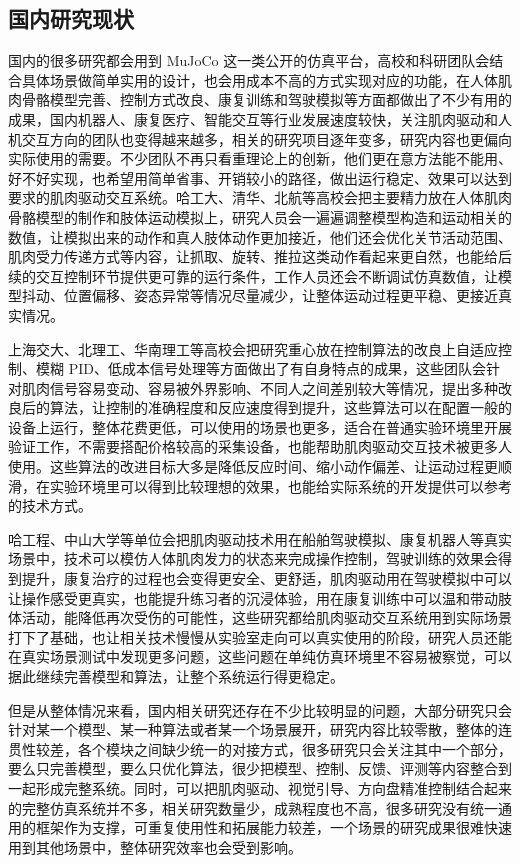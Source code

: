 \subsection{国内研究现状}
国内的很多研究都会用到 MuJoCo 这一类公开的仿真平台，高校和科研团队会结合具体场景做简单实用的设计，也会用成本不高的方式实现对应的功能，在人体肌肉骨骼模型完善、控制方式改良、康复训练和驾驶模拟等方面都做出了不少有用的成果，国内机器人、康复医疗、智能交互等行业发展速度较快，关注肌肉驱动和人机交互方向的团队也变得越来越多，相关的研究项目逐年变多，研究内容也更偏向实际使用的需要。不少团队不再只看重理论上的创新，他们更在意方法能不能用、好不好实现，也希望用简单省事、开销较小的路径，做出运行稳定、效果可以达到要求的肌肉驱动交互系统。哈工大、清华、北航等高校会把主要精力放在人体肌肉骨骼模型的制作和肢体运动模拟上，研究人员会一遍遍调整模型构造和运动相关的数值，让模拟出来的动作和真人肢体动作更加接近，他们还会优化关节活动范围、肌肉受力传递方式等内容，让抓取、旋转、推拉这类动作看起来更自然，也能给后续的交互控制环节提供更可靠的运行条件，工作人员还会不断调试仿真数值，让模型抖动、位置偏移、姿态异常等情况尽量减少，让整体运动过程更平稳、更接近真实情况\cite{zhang2026shenjing}。

上海交大、北理工、华南理工等高校会把研究重心放在控制算法的改良上自适应控制、模糊 PID、低成本信号处理等方面做出了有自身特点的成果，这些团队会针对肌肉信号容易变动、容易被外界影响、不同人之间差别较大等情况，提出多种改良后的算法，让控制的准确程度和反应速度得到提升，这些算法可以在配置一般的设备上运行，整体花费更低，可以使用的场景也更多，适合在普通实验环境里开展验证工作，不需要搭配价格较高的采集设备，也能帮助肌肉驱动交互技术被更多人使用。这些算法的改进目标大多是降低反应时间、缩小动作偏差、让运动过程更顺滑，在实验环境里可以得到比较理想的效果，也能给实际系统的开发提供可以参考的技术方式\cite{wang2026jiyu}。

哈工程、中山大学等单位会把肌肉驱动技术用在船舶驾驶模拟、康复机器人等真实场景中，技术可以模仿人体肌肉发力的状态来完成操作控制，驾驶训练的效果会得到提升，康复治疗的过程也会变得更安全、更舒适，肌肉驱动用在驾驶模拟中可以让操作感受更真实，也能提升练习者的沉浸体验，用在康复训练中可以温和带动肢体活动，能降低再次受伤的可能性，这些研究都给肌肉驱动交互系统用到实际场景打下了基础，也让相关技术慢慢从实验室走向可以真实使用的阶段，研究人员还能在真实场景测试中发现更多问题，这些问题在单纯仿真环境里不容易被察觉，可以据此继续完善模型和算法，让整个系统运行得更稳定。

但是从整体情况来看，国内相关研究还存在不少比较明显的问题，大部分研究只会针对某一个模型、某一种算法或者某一个场景展开，研究内容比较零散，整体的连贯性较差，各个模块之间缺少统一的对接方式，很多研究只会关注其中一个部分，要么只完善模型，要么只优化算法，很少把模型、控制、反馈、评测等内容整合到一起形成完整系统。同时，可以把肌肉驱动、视觉引导、方向盘精准控制结合起来的完整仿真系统并不多，相关研究数量少，成熟程度也不高，很多研究没有统一通用的框架作为支撑，可重复使用性和拓展能力较差，一个场景的研究成果很难快速用到其他场景中，整体研究效率也会受到影响。


